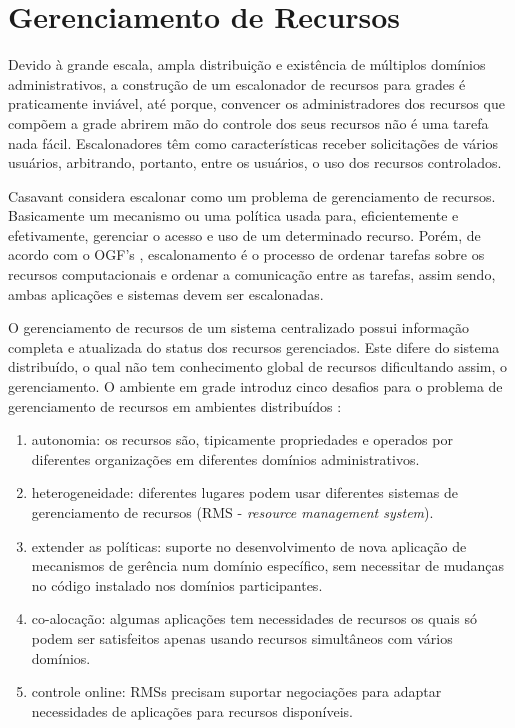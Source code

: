 \section{Gerenciamento de Recursos}

Devido à grande escala, ampla distribuição e existência de múltiplos domínios administrativos, a construção de um escalonador de recursos para grades é praticamente inviável, até porque, convencer os administradores dos recursos que compõem a grade abrirem mão do controle dos seus recursos não é uma tarefa nada fácil. Escalonadores têm como características receber solicitações de vários usuários, arbitrando, portanto, entre os usuários, o uso dos recursos controlados.  

Casavant \cite{Thomas1996} considera escalonar como um problema de gerenciamento de recursos. Basicamente um mecanismo ou uma política usada para, eficientemente e efetivamente, gerenciar o acesso e uso de um determinado recurso. Porém, de acordo com o OGF's \cite{M.2002}, escalonamento é o processo de ordenar tarefas sobre os recursos computacionais e ordenar a comunicação entre as tarefas, assim sendo, ambas aplicações e sistemas devem ser escalonadas. 

O gerenciamento de recursos de um sistema centralizado possui informação completa e atualizada do status dos recursos gerenciados. Este difere do sistema distribuído, o qual não tem conhecimento global de recursos dificultando assim, o gerenciamento. O ambiente em grade introduz cinco desafios para o problema de gerenciamento de recursos em ambientes distribuídos \cite{Karl1998}:

\begin{enumerate}
\item autonomia: os recursos são, tipicamente propriedades e operados por diferentes organizações em diferentes domínios administrativos.
\item heterogeneidade: diferentes lugares podem usar diferentes sistemas de gerenciamento de recursos (RMS - \emph{resource management system}).
\item extender as políticas: suporte no desenvolvimento de nova aplicação de mecanismos de gerência num domínio específico, sem necessitar de mudanças no código instalado nos domínios participantes.
\item co-alocação: algumas aplicações tem necessidades de recursos os quais só podem ser satisfeitos apenas usando recursos simultâneos com vários domínios.
\item controle online: RMSs precisam suportar negociações para adaptar necessidades de aplicações para recursos disponíveis.
\end{enumerate}


